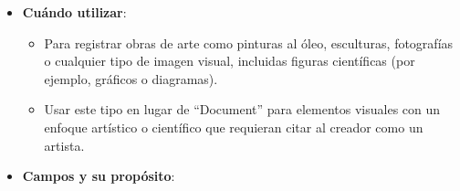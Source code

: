 \documentclass[
  jou,
  floatsintext,
  longtable,
  a4paper,
  nolmodern,
  notxfonts,
  notimes,
  12pt,
  colorlinks=true,linkcolor=blue,citecolor=blue,urlcolor=blue]{apa7}
\providecommand{\tightlist}{%
  \setlength{\itemsep}{0pt}\setlength{\parskip}{0pt}}
\begin{document}
\begin{itemize}
\tightlist
\item
  \textbf{Cuándo utilizar}:

  \begin{itemize}
  \tightlist
  \item
    Para registrar obras de arte como pinturas al óleo, esculturas,
    fotografías o cualquier tipo de imagen visual, incluidas figuras
    científicas (por ejemplo, gráficos o diagramas).
  \item
    Usar este tipo en lugar de ``Document'' para elementos visuales con
    un enfoque artístico o científico que requieran citar al creador
    como un artista.
  \end{itemize}
\item
  \textbf{Campos y su propósito}:


\end{itemize}
\end{document}
